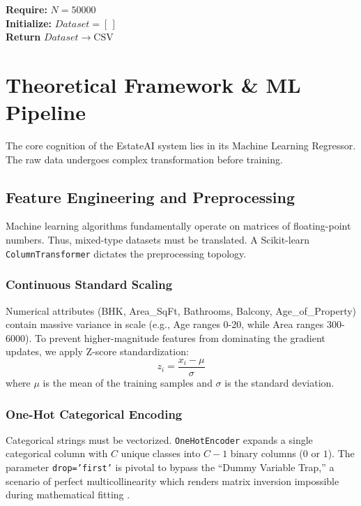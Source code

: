 \documentclass[conference]{IEEEtran}
\begin{document}
\begin{algorithm}
\SetAlgoLined
\textbf{Require:} $N = 50000$ \\
\textbf{Initialize:} $Dataset = [\,]$ \\
 \textbf{Return} $Dataset \to \text{CSV}$
 \caption{Synthetic Data Generation Algorithm}
\end{algorithm}

\section{Theoretical Framework \& ML Pipeline}

The core cognition of the EstateAI system lies in its Machine Learning Regressor. The raw data undergoes complex transformation before training.

\subsection{Feature Engineering and Preprocessing}
Machine learning algorithms fundamentally operate on matrices of floating-point numbers. Thus, mixed-type datasets must be translated. A Scikit-learn \texttt{ColumnTransformer} dictates the preprocessing topology.

\subsubsection{Continuous Standard Scaling}
Numerical attributes (BHK, Area\_SqFt, Bathrooms, Balcony, Age\_of\_Property) contain massive variance in scale (e.g., Age ranges 0-20, while Area ranges 300-6000). To prevent higher-magnitude features from dominating the gradient updates, we apply Z-score standardization:
\begin{equation}
z_{i} = \frac{x_{i} - \mu}{\sigma}
\end{equation}
where $\mu$ is the mean of the training samples and $\sigma$ is the standard deviation.

\subsubsection{One-Hot Categorical Encoding}
Categorical strings must be vectorized. \texttt{OneHotEncoder} expands a single categorical column with $C$ unique classes into $C-1$ binary columns ($0$ or $1$). The parameter \texttt{drop='first'} is pivotal to bypass the ``Dummy Variable Trap,'' a scenario of perfect multicollinearity which renders matrix inversion impossible during mathematical fitting \cite{dummy}. 
\end{document}
